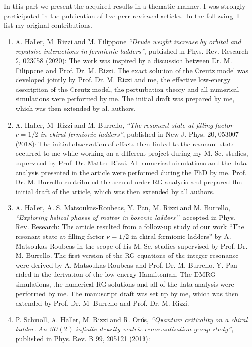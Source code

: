 
In this part we present the acquired results in a thematic manner.
I was strongly participated in the publication of five peer-reviewed articles.
In the following, I list my original contributions.

\begin{enumerate}
    \item{\underline{A. Haller}, M. Rizzi and M. Filippone {\it ``Drude weight increase by orbital and repulsive interactions in fermionic ladders''}, published in Phys. Rev. Research 2, 023058 (2020):
    The work was inspired by a discussion between Dr. M. Filippone and Prof. Dr. M. Rizzi. The exact solution of the Creutz model was developed jointly by Prof. Dr. M. Rizzi and me, the effective low-energy description of the Creutz model, the perturbation theory and all numerical simulations were performed by me. The initial draft was prepared by me, which was then extended by all authors.}
    \item{\underline{A. Haller}, M. Rizzi and M. Burrello, {\it ``The resonant state at filling factor $\nu=1/2$ in chiral fermionic ladders''}, published in New J. Phys. 20, 053007 (2018): The initial observation of effects then linked to the resonant state occurred to me while working on a different project during my M. Sc. studies, supervised by Prof. Dr. Matteo Rizzi. All numerical simulations and the data analysis presented in the article were performed during the PhD by me. Prof. Dr. M. Burrello contributed the second-order RG analysis and prepared the initial draft of the article, which was then extended by all authors.}
    \item{\underline{A. Haller}, A. S. Matsoukas-Roubeas, Y. Pan, M. Rizzi and M. Burrello, {\it ``Exploring helical phases of matter in bosonic ladders''}, accepted in Phys. Rev. Research:
    The article resulted from a follow-up study of our work ``The resonant state at filling factor $\nu=1/2$ in chiral fermionic ladders'' by A. Matsoukas-Roubeas in the scope of his M. Sc. studies supervised by Prof. Dr. M. Burrello. The first version of the RG equations of the integer resonance were derived by A. Matsoukas-Roubeas and Prof. Dr. M. Burrello. Y. Pan aided in the derivation of the low-energy Hamiltonian. The DMRG simulations, the numerical RG solutions and all of the data analysis were performed by me. The manuscript draft was set up by me, which was then extended by Prof. Dr. M. Burrello and Prof. Dr. M. Rizzi.}
    \item{P. Schmoll, \underline{A. Haller}, M. Rizzi and R. Orús, {\it ``Quantum criticality on a chiral ladder: An SU$(2)$ infinite density matrix renormalization group study''}, published in Phys. Rev. B 99, 205121 (2019):
}
\end{enumerate}
